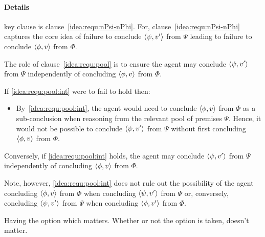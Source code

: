 \paragraph{Details}

\begin{note}
  key clause is clause~\ref{idea:requ:nPsi-nPhi}.
  For, clause~\ref{idea:requ:nPsi-nPhi} captures the core idea of failure to conclude \(\langle \psi, v' \rangle\) from \(\Psi\) leading to failure to conclude \(\langle \phi, v \rangle\) from \(\Phi\).

  The role of clause~\ref{idea:requ:pool} is to ensure the agent may conclude \(\langle \psi, v' \rangle\) from \(\Psi\) independently of concluding \(\langle \phi, v \rangle\) from \(\Phi\).

  If \ref{idea:requ:pool:int} were to fail to hold then:
  \begin{itemize}
  \item
    By~\ref{idea:requ:pool:int}, the agent would need to conclude \(\langle \phi, v \rangle\) from \(\Phi\) as a sub-conclusion when reasoning from the relevant pool of premises \(\Psi\).
    Hence, it would not be possible to conclude \(\langle \psi, v' \rangle\) from \(\Psi\) without first concluding \(\langle \phi, v \rangle\) from \(\Phi\).
  \end{itemize}

  Conversely, if \ref{idea:requ:pool:int} holds, the agent may conclude \(\langle \psi, v' \rangle\) from \(\Psi\) independently of concluding \(\langle \phi, v \rangle\) from \(\Phi\).

  Note, however, \ref{idea:requ:pool:int} does not rule out the possibility of the agent concluding \(\langle \phi, v \rangle\) from \(\Phi\) when concluding \(\langle \psi, v' \rangle\) from \(\Psi\) or, conversely, concluding \(\langle \psi, v' \rangle\) from \(\Psi\) when concluding \(\langle \phi, v' \rangle\) from \(\Phi\).

  Having the option which matters.
  Whether or not the option is taken, doesn't matter.
\end{note}

